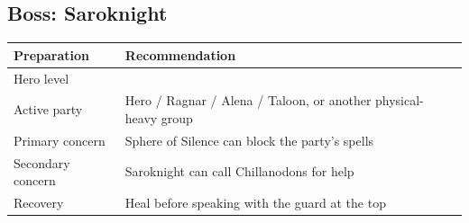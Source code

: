 \documentclass[
  american,
  10pt,
  letterpaper,
  oneside,
  open=any]{scrreprt}
\newcounter{none} %
\newenvironment{guidetable}{%
  \small\setstretch{1.0}%
  \setlength{\tabcolsep}{4pt}%
  \setlength{\LTpre}{8pt}\setlength{\LTpost}{10pt}%
  \renewcommand{\arraystretch}{1.16}%
}{ }
\begin{document}
\subsection{Boss: Saroknight}\label{boss-saroknight}

\begin{guidetable}

{\def\LTcaptype{none} %
\begin{longtable}[]{@{}
  >{\raggedright\arraybackslash}p{}
  >{\raggedright\arraybackslash}p{}@{}}
\toprule\noalign{}
\begin{minipage}[b]{\linewidth}\raggedright
\color{GuideGreen}\bfseries Preparation
\end{minipage} & \begin{minipage}[b]{\linewidth}\raggedright
\color{GuideGreen}\bfseries Recommendation
\end{minipage} \\
\midrule\noalign{}
\endhead
\bottomrule\noalign{}
\endlastfoot
Hero level & 25 \\
Active party & Hero / Ragnar / Alena / Taloon, or another physical-heavy
group \\
Primary concern & Sphere of Silence can block the party's spells \\
Secondary concern & Saroknight can call Chillanodons for help \\
Recovery & Heal before speaking with the guard at the top \\
\end{longtable}
}

\end{guidetable}
\end{document}
